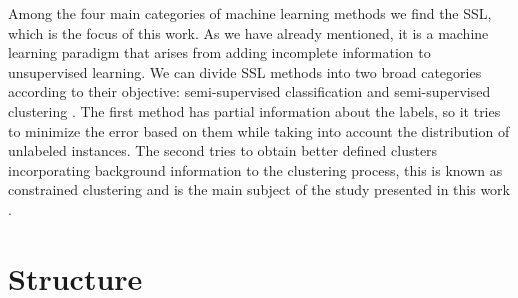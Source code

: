 Among the four main categories of machine learning methods we find the \acf{SSL}, which is the focus of this work. As we have already mentioned, it is a machine learning paradigm that arises from adding incomplete information to unsupervised learning. We can divide \acs{SSL} methods into two broad categories according to their objective: semi-supervised classification and semi-supervised clustering \cite{chapelle2009semi}. The first method has partial information about the labels, so it tries to minimize the error based on them while taking into account the distribution of unlabeled instances. The second tries to obtain better defined clusters incorporating background information to the clustering process, this is known as constrained clustering and is the main subject of the study presented in this work \cite{triguero2015self}.

\section{Structure}
































